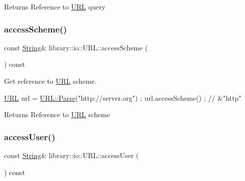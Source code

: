 \begin{DoxyReturn}{Returns}
Reference to \hyperlink{classlibrary_1_1io_1_1_u_r_l}{U\+RL} query 
\end{DoxyReturn}
\mbox{\label{classlibrary_1_1io_1_1_u_r_l_a017a872b7f1617d67b0e9f032be24173}} 
\subsubsection{\texorpdfstring{access\+Scheme()}{accessScheme()}}
{\footnotesize\ttfamily const \hyperlink{namespacelibrary_1_1io_a7469b45835a4421045db344d6a5a1f85}{String}\& library\+::io\+::\+U\+R\+L\+::access\+Scheme (\begin{DoxyParamCaption}{ }\end{DoxyParamCaption}) const}



Get reference to \hyperlink{classlibrary_1_1io_1_1_u_r_l}{U\+RL} scheme. 


\begin{DoxyCode}
\hyperlink{classlibrary_1_1io_1_1_u_r_l_a7e9c070138a6dbd000ffb10b7cd8a5c4}{URL} url = \hyperlink{classlibrary_1_1io_1_1_u_r_l_a98cf42141cf75e1dd5362eb208a1e2bd}{URL::Parse}(\textcolor{stringliteral}{"http://server.org"}) ;
url.accessScheme() ; \textcolor{comment}{// &"http"}
\end{DoxyCode}


\begin{DoxyReturn}{Returns}
Reference to \hyperlink{classlibrary_1_1io_1_1_u_r_l}{U\+RL} scheme 
\end{DoxyReturn}
\mbox{\label{classlibrary_1_1io_1_1_u_r_l_ab8ef76cb7d42d6d584be8a3278fbb96d}} 
\subsubsection{\texorpdfstring{access\+User()}{accessUser()}}
{\footnotesize\ttfamily const \hyperlink{namespacelibrary_1_1io_a7469b45835a4421045db344d6a5a1f85}{String}\& library\+::io\+::\+U\+R\+L\+::access\+User (\begin{DoxyParamCaption}{ }\end{DoxyParamCaption}) const}




